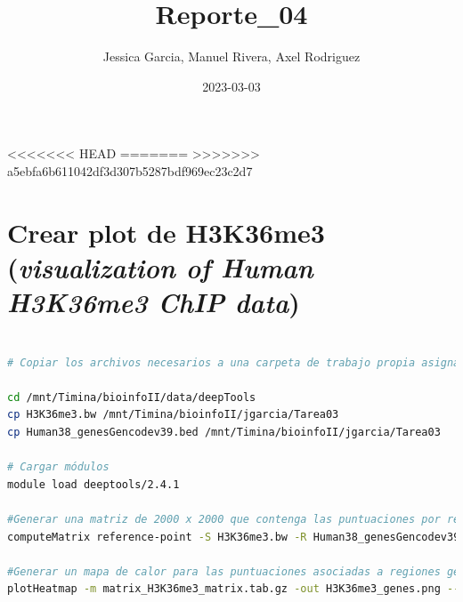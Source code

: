 \documentclass[
]{article}
\title{Reporte\_04}
\author{Jessica Garcia, Manuel Rivera, Axel Rodriguez}
\date{2023-03-03}
\begin{document}
\maketitle

{
<<<<<<< HEAD
\setcounter{tocdepth}{2}
=======
\setcounter{tocdepth}{3}
>>>>>>> a5ebfa6b611042df3d307b5287bdf969ec23c2d7
\tableofcontents
}
\hypertarget{crear-plot-de-h3k36me3-visualization-of-human-h3k36me3-chip-data}{%
\section{\texorpdfstring{Crear plot de H3K36me3 (\emph{visualization of
Human H3K36me3 ChIP
data})}{Crear plot de H3K36me3 (visualization of Human H3K36me3 ChIP data)}}\label{crear-plot-de-h3k36me3-visualization-of-human-h3k36me3-chip-data}}

\begin{lstlisting}[language=bash]

# Copiar los archivos necesarios a una carpeta de trabajo propia asignada para esta tarea

cd /mnt/Timina/bioinfoII/data/deepTools
cp H3K36me3.bw /mnt/Timina/bioinfoII/jgarcia/Tarea03
cp Human38_genesGencodev39.bed /mnt/Timina/bioinfoII/jgarcia/Tarea03 

# Cargar módulos
module load deeptools/2.4.1

#Generar una matriz de 2000 x 2000 que contenga las puntuaciones por regiones del genoma y preparar un archivo intermedio para usarse con el comando plotHeatmap.
computeMatrix reference-point -S H3K36me3.bw -R Human38_genesGencodev39.bed --referencePoint center -a 2000 -b 2000 -out matrix_H3K36me3_matrix.tab.gz

#Generar un mapa de calor para las puntuaciones asociadas a regiones genómicas
plotHeatmap -m matrix_H3K36me3_matrix.tab.gz -out H3K36me3_genes.png --heatmapHeight 15 --refPointLabel gene.center --regionsLabel genes --plotTitle ' H3K36me3 signal'
\end{lstlisting}
\end{document}
